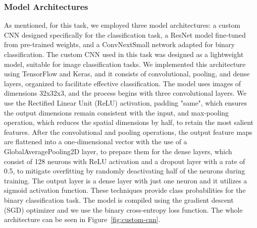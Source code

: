 \documentclass[runningheads]{llncs}
\begin{document}
\subsubsection{Model Architectures}
\vspace*{-30ex} %
As mentioned, for this task, we employed three model architectures:  a custom CNN designed specifically for the classification task, a ResNet model fine-tuned from pre-trained weights, and a ConvNextSmall network adapted for binary classification. 
The custom CNN used in this task was designed as a lightweight model, suitable for image classification tasks. We implemented this architecture using TensorFlow and Keras, and it consists of convolutional, pooling, and dense layers, organized to facilitate effective classification. The model uses images of dimensions 32x32x3, and the process begins with three convolutional layers. We use the Rectified Linear Unit (ReLU) activation, padding "same", which ensures the output dimensions remain consistent with the input, and max-pooling operation, which reduces the spatial dimensions by half, to retain the most salient features. After the convolutional and pooling operations, the output feature maps are flattened into a one-dimensional vector with the use of a GlobalAveragePooling2D layer, to prepare them for the dense layers, which consist of 128 neurons with ReLU activation and a dropout layer with a rate of 0.5, to mitigate overfitting by randomly deactivating half of the neurons during training. The output layer is a dense layer with just one neuron and it utilizes a sigmoid activation function. These techniques provide class probabilities for the binary classification task. The model is compiled using the gradient descent (SGD) optimizer and we use the binary cross-entropy loss function. The whole architecture can be seen in Figure~\ref{fig:custom-cnn}.
\end{document}
